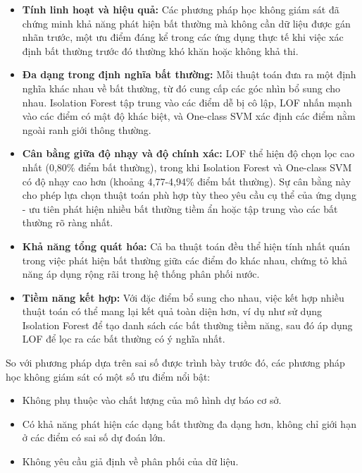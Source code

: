 \begin{itemize}
    \item \textbf{Tính linh hoạt và hiệu quả:} Các phương pháp học không giám sát đã chứng minh khả năng phát hiện bất thường mà không cần dữ liệu được gán nhãn trước, một ưu điểm đáng kể trong các ứng dụng thực tế khi việc xác định bất thường trước đó thường khó khăn hoặc không khả thi.
    
    \item \textbf{Đa dạng trong định nghĩa bất thường:} Mỗi thuật toán đưa ra một định nghĩa khác nhau về bất thường, từ đó cung cấp các góc nhìn bổ sung cho nhau. Isolation Forest tập trung vào các điểm dễ bị cô lập, LOF nhấn mạnh vào các điểm có mật độ khác biệt, và One-class SVM xác định các điểm nằm ngoài ranh giới thông thường.
    
    \item \textbf{Cân bằng giữa độ nhạy và độ chính xác:} LOF thể hiện độ chọn lọc cao nhất (0,80\% điểm bất thường), trong khi Isolation Forest và One-class SVM có độ nhạy cao hơn (khoảng 4,77-4,94\% điểm bất thường). Sự cân bằng này cho phép lựa chọn thuật toán phù hợp tùy theo yêu cầu cụ thể của ứng dụng - ưu tiên phát hiện nhiều bất thường tiềm ẩn hoặc tập trung vào các bất thường rõ ràng nhất.
    
    \item \textbf{Khả năng tổng quát hóa:} Cả ba thuật toán đều thể hiện tính nhất quán trong việc phát hiện bất thường giữa các điểm đo khác nhau, chứng tỏ khả năng áp dụng rộng rãi trong hệ thống phân phối nước.
    
    \item \textbf{Tiềm năng kết hợp:} Với đặc điểm bổ sung cho nhau, việc kết hợp nhiều thuật toán có thể mang lại kết quả toàn diện hơn, ví dụ như sử dụng Isolation Forest để tạo danh sách các bất thường tiềm năng, sau đó áp dụng LOF để lọc ra các bất thường có ý nghĩa nhất.
\end{itemize}

So với phương pháp dựa trên sai số được trình bày trước đó, các phương pháp học không giám sát có một số ưu điểm nổi bật:

\begin{itemize}
    \item Không phụ thuộc vào chất lượng của mô hình dự báo cơ sở.
    \item Có khả năng phát hiện các dạng bất thường đa dạng hơn, không chỉ giới hạn ở các điểm có sai số dự đoán lớn.
    \item Không yêu cầu giả định về phân phối của dữ liệu.
\end{itemize}

